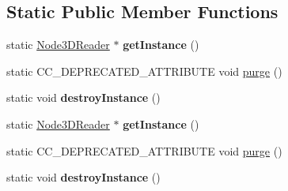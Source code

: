\subsection*{Static Public Member Functions}
\begin{DoxyCompactItemize}
\item 
\mbox{\label{classcocostudio_1_1Node3DReader_a76431c574386803c17995a321107bdce}} 
static \hyperlink{classcocostudio_1_1Node3DReader}{Node3\+D\+Reader} $\ast$ {\bfseries get\+Instance} ()
\item 
static C\+C\+\_\+\+D\+E\+P\+R\+E\+C\+A\+T\+E\+D\+\_\+\+A\+T\+T\+R\+I\+B\+U\+TE void \hyperlink{classcocostudio_1_1Node3DReader_a71968894f221705af6259ab4f8482e3b}{purge} ()
\item 
\mbox{\label{classcocostudio_1_1Node3DReader_a7e5ed61d934904a171b5aaff2d179768}} 
static void {\bfseries destroy\+Instance} ()
\item 
\mbox{\label{classcocostudio_1_1Node3DReader_ab07c6ef6a41b0a7531fdbdef3c6f46c1}} 
static \hyperlink{classcocostudio_1_1Node3DReader}{Node3\+D\+Reader} $\ast$ {\bfseries get\+Instance} ()
\item 
static C\+C\+\_\+\+D\+E\+P\+R\+E\+C\+A\+T\+E\+D\+\_\+\+A\+T\+T\+R\+I\+B\+U\+TE void \hyperlink{classcocostudio_1_1Node3DReader_a72927cdd6534faa8df31fd9337bf6956}{purge} ()
\item 
\mbox{\label{classcocostudio_1_1Node3DReader_adc2e9cacfdacc68fe48bea65e8af66b5}} 
static void {\bfseries destroy\+Instance} ()
\end{DoxyCompactItemize}
